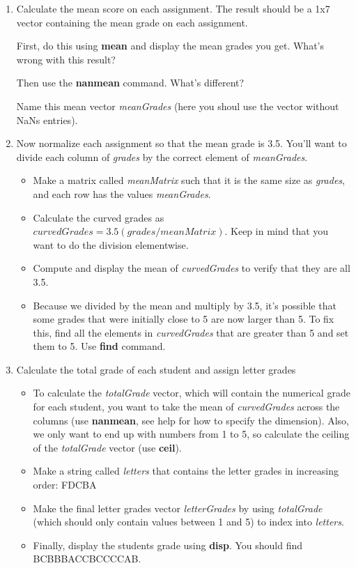 \documentclass[12pt]{TDTP}
\begin{document}
\begin{enumerate}
\item Calculate the mean score on each assignment. The result should be a 1x7 vector containing the mean grade on each assignment.

First, do this using \textbf{mean} and display the mean grades you get. What's wrong with this result?

Then use the \textbf{nanmean} command. What's different?

Name this mean vector \emph{meanGrades} (here you shoul use the vector without NaNs entries).

\item Now normalize each assignment so that the mean grade is 3.5. You'll want to divide each column of \emph{grades} by the correct element of \emph{meanGrades}.
\begin{itemize}
\item Make a matrix called \emph{meanMatrix} such that it is the same size as \emph{grades}, and each row has the values \emph{meanGrades}. 
\item Calculate the curved grades as $curvedGrades = 3.5 (grades/meanMatrix)$.
Keep in mind that you want to do the division elementwise.
\item Compute and display the mean of \emph{curvedGrades} to verify that they are all 3.5.
\item Because we divided by the mean and multiply by 3.5, it's possible that some grades that were initially close to 5 are now larger than 5.
To fix this, find all the elements in \emph{curvedGrades} that are greater than 5 and set them to 5. Use \textbf{find} command.
\end{itemize}

\item Calculate the total grade of each student and assign letter grades
\begin{itemize}
\item To calculate the \textit{totalGrade} vector, which will contain the numerical grade for each student, you want to take the mean of \textit{curvedGrades} across the columns (use \textbf{nanmean}, see help for how to specify the dimension). 
Also, we only want to end up with numbers from 1 to 5, so calculate the ceiling of the \textit{totalGrade} vector (use \textbf{ceil}).

\item Make a string called \textit{letters} that contains the letter grades in increasing order: FDCBA

\item Make the final letter grades vector \textit{letterGrades} by using \textit{totalGrade} (which should only contain values between 1 and 5) to index into \textit{letters}.

\item Finally, display the students grade using \textbf{disp}. You should find BCBBBACCBCCCCAB.
\end{itemize}
\end{enumerate}
\end{document}
